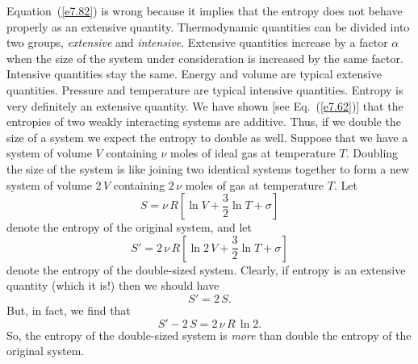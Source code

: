 Equation~(\ref{e7.82}) is wrong because it implies that the entropy does not behave 
properly as an extensive quantity. Thermodynamic quantities can be
divided into two groups, {\em extensive}\/ and {\em intensive}. 
Extensive quantities increase
by a factor $\alpha$ when  the size of the system under consideration is
increased by the same factor. Intensive quantities  stay the same. Energy and volume
are typical extensive quantities. Pressure and temperature are typical intensive
quantities. Entropy is very definitely an extensive quantity. We have shown 
 [see Eq.~(\ref{e7.62})] that the entropies of two weakly interacting systems
are additive. Thus, if we  double the size of a system we expect the
entropy to double as well. Suppose that we have a system of
volume $V$ containing $\nu$ moles of ideal gas at temperature $T$. Doubling
the size of the system is like joining two identical systems together to
form a new system of volume $2\,V$ containing $2\,\nu$ moles of gas at temperature $T$.
Let 
\begin{equation}
S = \nu \,R \left[\ln V + \frac{3}{2} \ln T + \sigma\right]
\end{equation}
denote  the entropy of the original system, and let
\begin{equation}
S' = 2\,\nu\, R \left[\ln 2\,V + \frac{3}{2} \ln T + \sigma\right]
\end{equation}
denote the entropy of the double-sized system. Clearly, if entropy is an extensive
quantity (which it is!) then we should have
\begin{equation}
	S' = 2\, S.
\end{equation}
But, in fact, we find that
\begin{equation}
S' - 2 \,S = 2\,\nu \,R \,\ln 2.\label{e7.87}
\end{equation}
So, the entropy of the double-sized system is {\em more}\/ than double the entropy of the
original system.

